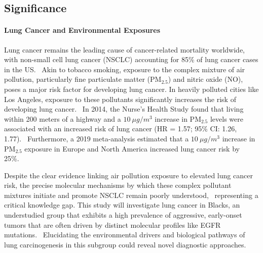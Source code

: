\subsection{Significance}





\paragraph{Lung Cancer and Environmental Exposures}
Lung cancer remains the leading cause of cancer-related mortality worldwide, with non-small cell lung cancer (NSCLC) 
accounting for 85\% of lung cancer cases in the US.~\cite{molina_nonsmall_2008} 
Akin to tobacco smoking, exposure to the complex mixture of air pollution, particularly fine particulate matter (PM$_{2.5}$) and nitric oxide (NO), 
poses a major risk factor for developing lung cancer. 
In heavily polluted cities like Los Angeles, exposure to these pollutants significantly increases the risk of developing lung cancer.~\cite{x} 
In 2014, the Nurse's Health Study found that living within 200 meters of a highway and a $10~\mu g/m^{3}$ increase in PM$_{2.5}$ 
levels were associated with an increased risk of lung cancer (HR = 1.57; 95\% CI: 1.26, 1.77).~\cite{puett_particulate_2014} 
Furthermore, a 2019 meta-analysis estimated that a $10~\mu g/m^{3}$ increase in PM$_{2.5}$ exposure in Europe and North America increased lung cancer risk by 25\%.~\cite{huang_ambient_2021}

Despite the clear evidence linking air pollution exposure to elevated lung cancer risk, 
the precise molecular mechanisms by which these complex pollutant mixtures initiate and promote NSCLC remain poorly understood,~\cite{x} 
representing a critical knowledge gap. 
This study will investigate lung cancer in Blacks, an understudied group that exhibits a high prevalence of aggressive, 
early-onset tumors that are often driven by distinct molecular profiles like EGFR mutations.~\cite{x}
Elucidating the environmental drivers and biological pathways of lung carcinogenesis in this subgroup could reveal novel diagnostic approaches. 

